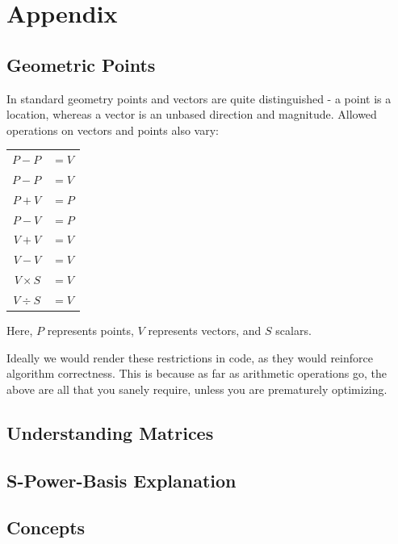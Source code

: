 \documentclass[openany]{book}
\begin{document}
\chapter{Appendix}
\renewcommand{\thesection}{\Alph{section}}

\section{Geometric Points}
In standard geometry points and vectors are quite distinguished - a  
point is a location, whereas a vector is an unbased direction and
magnitude.  Allowed operations on vectors and points also vary:

\begin{tabular}{r l}
  $P - P$ & $= V$ \\

  $P - P$ & $= V$ \\

  $P + V$ & $= P$ \\

  $P - V$ & $= P$ \\

  $V + V$ & $= V$ \\

  $V - V$ & $= V$ \\

  $V \times S$ & $= V$ \\

  $V \div S$ & $= V$ \\
\end{tabular}

Here, $P$ represents points, $V$ represents vectors, and $S$ scalars.

Ideally we would render these restrictions in code, as they would
reinforce algorithm correctness.  This is because as far as arithmetic
operations go, the above are all that you sanely require, unless you
are prematurely optimizing.

\section{Understanding Matrices}

\section{S-Power-Basis Explanation}

\section{Concepts}
\end{document}
